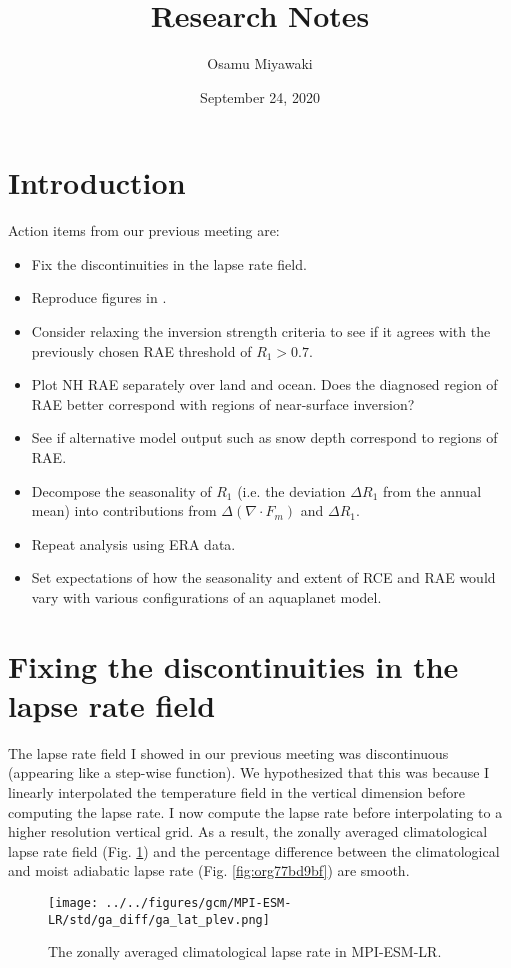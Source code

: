 \documentclass[11pt]{article}
\author{Osamu Miyawaki}
\date{September 24, 2020}
\title{Research Notes}
\begin{document}
\maketitle

\section{Introduction}
\label{sec:orgc88dfe1}
Action items from our previous meeting are:
\begin{itemize}
\item Fix the discontinuities in the lapse rate field.
\item Reproduce figures in \cite{stone1979}.
\item Consider relaxing the inversion strength criteria to see if it agrees with the previously chosen RAE threshold of \(R_1>0.7\).
\item Plot NH RAE separately over land and ocean. Does the diagnosed region of RAE better correspond with regions of near-surface inversion?
\item See if alternative model output such as snow depth correspond to regions of RAE.
\item Decompose the seasonality of \(R_1\) (i.e. the deviation \(\Delta R_1\) from the annual mean) into contributions from \(\Delta(\nabla\cdot F_m)\) and \(\Delta R_1\).
\item Repeat analysis using ERA data.
\item Set expectations of how the seasonality and extent of RCE and RAE would vary with various configurations of an aquaplanet model.
\end{itemize}

\section{Fixing the discontinuities in the lapse rate field}
\label{sec:orgf4a5237}
The lapse rate field I showed in our previous meeting was discontinuous (appearing like a step-wise function). We hypothesized that this was because I linearly interpolated the temperature field in the vertical dimension before computing the lapse rate. I now compute the lapse rate before interpolating to a higher resolution vertical grid. As a result, the zonally averaged climatological lapse rate field (Fig. \ref{fig:org3f41b82}) and the percentage difference between the climatological and moist adiabatic lapse rate (Fig. \ref{fig:org77bd9bf}) are smooth.

\begin{figure}[htbp]
\centering
\texttt{[image: ../../figures/gcm/MPI-ESM-LR/std/ga\_diff/ga\_lat\_plev.png]}
\caption{\label{fig:org3f41b82}The zonally averaged climatological lapse rate in MPI-ESM-LR.}
\end{figure}
\end{document}
